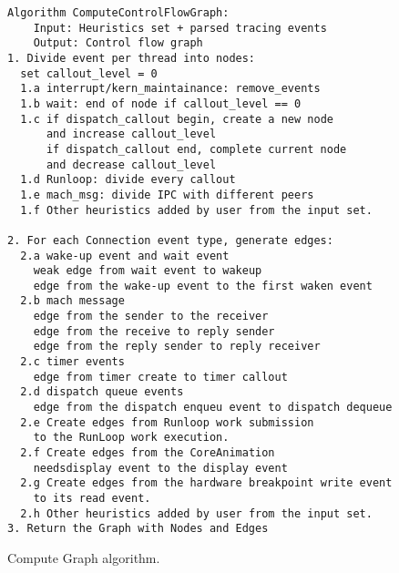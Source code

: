 \begin{figure}[tb]
\footnotesize\begin{verbatim}
Algorithm ComputeControlFlowGraph:
    Input: Heuristics set + parsed tracing events
    Output: Control flow graph
1. Divide event per thread into nodes:
  set callout_level = 0
  1.a interrupt/kern_maintainance: remove_events
  1.b wait: end of node if callout_level == 0
  1.c if dispatch_callout begin, create a new node
      and increase callout_level
      if dispatch_callout end, complete current node
      and decrease callout_level
  1.d Runloop: divide every callout
  1.e mach_msg: divide IPC with different peers
  1.f Other heuristics added by user from the input set.

2. For each Connection event type, generate edges:
  2.a wake-up event and wait event
    weak edge from wait event to wakeup
    edge from the wake-up event to the first waken event
  2.b mach message
    edge from the sender to the receiver
    edge from the receive to reply sender
    edge from the reply sender to reply receiver
  2.c timer events
    edge from timer create to timer callout
  2.d dispatch queue events
    edge from the dispatch enqueu event to dispatch dequeue
  2.e Create edges from Runloop work submission
    to the RunLoop work execution.
  2.f Create edges from the CoreAnimation
    needsdisplay event to the display event
  2.g Create edges from the hardware breakpoint write event
    to its read event.
  2.h Other heuristics added by user from the input set.
3. Return the Graph with Nodes and Edges
\end{verbatim}
    \caption{\xxx Compute Graph algorithm.}
    \label{fig:alg-graphcomputing}
\end{figure}
